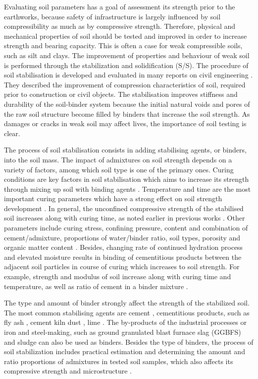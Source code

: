 \documentclass{amestyle}
\begin{document}
Evaluating soil parameters has a goal of assessment its strength prior to the earthworks, because safety of infrastructure is largely influenced by soil compressibility as much as by compressive strength. Therefore, physical and mechanical properties of soil should be tested and improved in order to increase strength and bearing capacity. This is often a case for weak compressible soils, such as silt and clays. The improvement of properties and behaviour of weak soil is performed through the stabilization and solidification (S/S). The procedure of soil stabilisation is developed and evaluated in many reports on civil engineering \cite{Jauberthie,Lindh202102,ArabiWild,Lindh2004}. They described the improvement of compression characteristics of soil, required prior to construction or civil objects. The stabilisation improves stiffness and durability of the soil-binder system because the initial natural voids and pores of the raw soil structure become filled by binders that increase the soil strength. As damages or cracks in weak soil may affect lives, the importance of soil testing is clear. 

The process of soil stabilisation consists in adding stabilising agents, or binders, into the soil mass. The impact of admixtures on soil strength depends on a variety of factors, among which soil type is one of the primary ones. Curing conditions are key factors in soil stabilisation which aims to increase its strength through mixing up soil with binding agents \cite{LiuStarcher,Oliveiraetal2012,Ghasemzadeh}. Temperature and time are the most important curing parameters which have a strong effect on soil strength development \cite{Aldaood,Yuetal2017,Oh}. In general, the unconfined compressive strength of the stabilised soil increases along with curing time, as noted earlier in previous works \cite{Howard,Lindh202102,Consoli}. Other parameters include curing stress, confining pressure, content and combination of cement/admixture, proportions of water/binder ratio, soil types, porosity and organic matter content \cite{Rabbi,CHAIYAPUT2022e01082,Lindh2022,AMADI2018305}. Besides, changing rate of continued hydration process and elevated moisture results in binding of cementitious products between the adjacent soil particles in course of curing which increases to soil strength. For example, strength and modulus of soil increase along with curing time and temperature, as well as ratio of cement in a binder mixture \cite{Wangetal2017}. 

The type and amount of binder strongly affect the strength of the stabilized soil. The most common stabilising agents are cement \cite{Rekik}, cementitious products, such as fly ash \cite{Tastan,Hasan}, cement kiln dust \cite{Solanki,Lindh2021a}, lime \cite{ARULRAJAH2017999,BIAN20211124,ANDAVAN20201125,INDIRAMMA2020694}. The by-products of the industrial processes or iron and steel-making, such as ground granulated blast furnace slag (GGBFS) \cite{Mozejko} and sludge \cite{Ingunza,Sharif} can also be used as binders. Besides the type of binders, the process of soil stabilization includes practical estimation and determining the amount and ratio proportions of admixtures in tested soil samples, which also affects its compressive strength and microstructure \cite{Lindh2001,Ahmed}.
\end{document}
